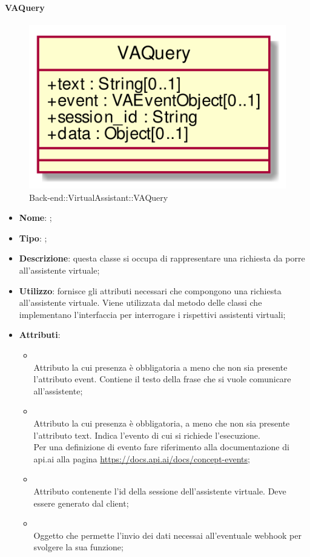 \hypertarget{VAQuery_label}{\paragraph{VAQuery}}
\begin{figure}[h]
	\centering
	\includegraphics[width=\textwidth,height=\textheight,keepaspectratio]{images/ClassVAQuery.png}
	\caption{Back-end::VirtualAssistant::VAQuery}
\end{figure}
\begin{itemize}
	\item \textbf{Nome}: ;
	\item \textbf{Tipo}: ;
	\item \textbf{Descrizione}: questa classe si occupa di rappresentare una richiesta da porre all'assistente virtuale;
	\item \textbf{Utilizzo}: fornisce gli attributi necessari che compongono una richiesta all'assistente virtuale. Viene utilizzata dal metodo  delle classi che implementano l'interfaccia  per interrogare i rispettivi assistenti virtuali;
	\item \textbf{Attributi}:
	\begin{itemize}
		\item[]  \\
		Attributo la cui presenza è obbligatoria a meno che non sia presente l'attributo event. Contiene il testo della frase che si vuole comunicare all'assistente;
		\item[]  \\
		Attributo la cui presenza è obbligatoria, a meno che non sia presente l'attributo text. Indica l'evento di cui si richiede l'esecuzione. \\ Per una definizione di evento fare riferimento alla documentazione di api.ai alla pagina \url{https://docs.api.ai/docs/concept-events};
		\item[]  \\
		Attributo contenente l'id della sessione dell'assistente virtuale. Deve essere generato dal client;
		\item[]  \\
		Oggetto che permette l'invio dei dati necessai all'eventuale webhook per svolgere la sua funzione;
	\end{itemize}
\end{itemize}
